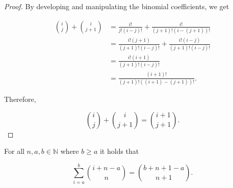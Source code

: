 \documentclass[12pt]{article}
\begin{document}
\begin{proof}

    By developing and manipulating the binomial coefficients, we get

    \begin{align*}
        \binom{i}{j} + \binom{i}{j+1} & = \frac{i!}{j!(i-j)!} + \frac{i!}{(j+1)!(i-(j+1))!}           \\
                                      & = \frac{i!(j+1)}{(j+1)!(i-j)!} + \frac{i!(i-j)}{(j+1)!(i-j)!} \\
                                      & = \frac{i!(i+1)}{(j+1)!(i-j)!}                                \\
                                      & = \frac{(i+1)!}{(j+1)!((i+1)-(j+1))!}.
    \end{align*}

    Therefore,

    $$
        \boxed{\binom{i}{j} + \binom{i}{j+1} = \binom{i+1}{j+1}}.
    $$

\end{proof}

\vspace{20px}

\begin{theorem} 
    \label{hockey_stick_identity}

    For all $n, a, b \in \mathbb{N}$ where $b \geq a$ it holds that

    $$
        \sum_{i=a}^{b} \binom{i+n-a}{n} = \binom{b+n+1-a}{n+1}.
    $$

\end{theorem}
\end{document}
